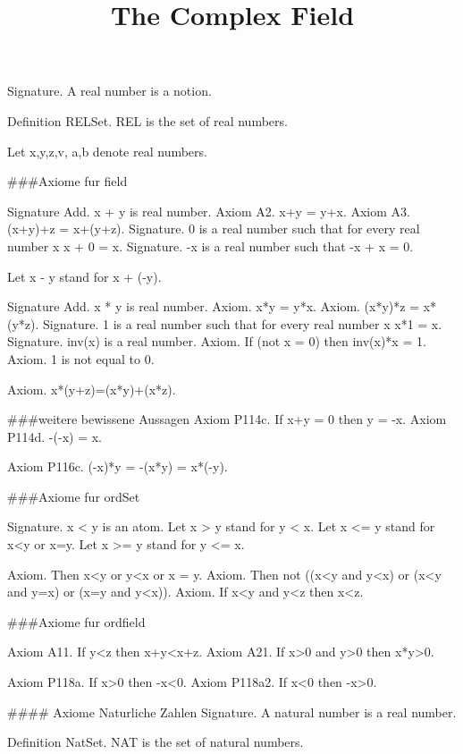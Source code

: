 \documentclass{article}
\newenvironment{forthel}{\begin{leftbar}}{\end{leftbar}}
\begin{document}
\title{The Complex Field}

\maketitle

\begin{forthel}
[set/-s] [element/-s] [number/-s] [integer/-s]

Signature. A real number is a notion.

Definition RELSet.
REL is the set of real numbers.

Let x,y,z,v, a,b denote real numbers.

###Axiome fur field

Signature Add. x + y is real number.
Axiom A2. x+y = y+x.
Axiom A3. (x+y)+z = x+(y+z).
Signature. 0 is a real number such that for every real number x x + 0 = x.
Signature. -x is a real number such that -x + x = 0.

Let x - y stand for x + (-y).

Signature Add. x * y is real number.
Axiom. x*y = y*x.
Axiom. (x*y)*z = x*(y*z).
Signature. 1 is a real number such that for every real number x x*1 = x.
Signature. inv(x) is a real number.
Axiom. If (not x = 0) then inv(x)*x = 1.
Axiom. 1 is not equal to 0.

Axiom. x*(y+z)=(x*y)+(x*z).

###weitere bewissene Aussagen
Axiom P114c. If x+y = 0 then y = -x.
Axiom P114d. -(-x) = x.

Axiom P116c. (-x)*y = -(x*y) = x*(-y).


###Axiome fur ordSet

Signature. x < y is an atom.
Let x > y stand for y < x.
Let x <= y stand for x<y or x=y.
Let x >= y stand for y <= x.

Axiom. Then x<y or y<x or x = y.
Axiom. Then not ((x<y and y<x) or (x<y and y=x) or (x=y and y<x)).
Axiom. If x<y and y<z then x<z.



###Axiome fur ordfield

Axiom A11. If y<z then x+y<x+z.
Axiom A21. If x>0 and y>0 then x*y>0.

Axiom P118a. If x>0 then -x<0.
Axiom P118a2. If x<0 then -x>0.



#### Axiome Naturliche Zahlen
Signature. A natural number is a real number.

Definition NatSet.
NAT is the set of natural numbers.


\end{forthel}
\end{document}
